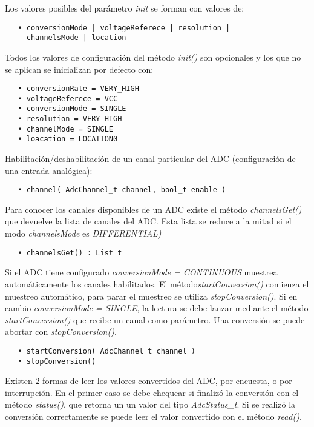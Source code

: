 Los valores posibles del parámetro \emph{init} se forman con valores de:

\begin{verbatim}
   • conversionMode | voltageReferece | resolution | 
     channelsMode | location
\end{verbatim}

Todos los valores de configuración del método \emph{init()} son opcionales y los que no se aplican se inicializan por defecto con:

\begin{verbatim}
   • conversionRate = VERY_HIGH
   • voltageReferece = VCC
   • conversionMode = SINGLE
   • resolution = VERY_HIGH
   • channelMode = SINGLE
   • loacation = LOCATION0
\end{verbatim}

Habilitación/deshabilitación de un canal particular del ADC (configuración de una entrada analógica):

\begin{verbatim}
   • channel( AdcChannel_t channel, bool_t enable )
\end{verbatim}

Para conocer los canales disponibles de un ADC existe el método 
\emph{channelsGet()} que devuelve la lista de canales del ADC. Esta lista se reduce a la mitad si el modo \emph{channelsMode} es \emph{DIFFERENTIAL)}

\begin{verbatim}
   • channelsGet() : List_t
\end{verbatim}

Si el ADC tiene configurado \emph{conversionMode = CONTINUOUS} muestrea automáticamente los canales habilitados. El método\emph{startConversion()} comienza el muestreo automático, para parar el muestreo se utiliza \emph{stopConversion()}. Si en cambio \emph{conversionMode = SINGLE}, la lectura se debe lanzar mediante el método \emph{startConversion()} que recibe un canal como parámetro. 
Una conversión se puede abortar con \emph{stopConversion()}.

\begin{verbatim}
   • startConversion( AdcChannel_t channel )
   • stopConversion()
\end{verbatim}

Existen 2 formas de leer los valores convertidos del ADC, por encuesta, o por interrupción. En el primer caso se debe chequear si finalizó la conversión con el método \emph{status()}, que retorna un un valor del tipo \emph{AdcStatus\_t}. Si se realizó la conversión correctamente se puede leer el valor convertido con el método \emph{read()}.

